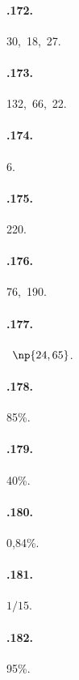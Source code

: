 \begin{multicols}{3}
\paragraph{\thechapter.172.} 30,~18,~27.

\paragraph{\thechapter.173.} 132,~66,~22.

\paragraph{\thechapter.174.} 6.

\paragraph{\thechapter.175.} 220.

\paragraph{\thechapter.176.} 76,~190.

\paragraph{\thechapter.177.} \officialeuro~$\np{24,65}$.

\paragraph{\thechapter.178.} 85\%.

\paragraph{\thechapter.179.} 40\%.

\paragraph{\thechapter.180.} 0,84\%.

\paragraph{\thechapter.181.} $ 1/15 $.

\paragraph{\thechapter.182.} 95\%.


\end{multicols}

